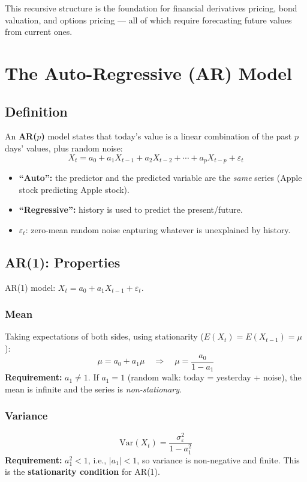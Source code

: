 \documentclass[11pt]{article}
\begin{document}
This recursive structure is the foundation for financial derivatives pricing,
bond valuation, and options pricing --- all of which require forecasting future
values from current ones.


\section{The Auto-Regressive (AR) Model}

\subsection{Definition}
An \textbf{AR($p$)} model states that today's value is a linear combination of
the past $p$ days' values, plus random noise:
\[
X_t = a_0 + a_1 X_{t-1} + a_2 X_{t-2} + \cdots + a_p X_{t-p} + \varepsilon_t
\]

\begin{itemize}
    \item \textbf{``Auto'':} the predictor and the predicted variable are the
      \emph{same} series (Apple stock predicting Apple stock).
    \item \textbf{``Regressive'':} history is used to predict the present/future.
    \item $\varepsilon_t$: zero-mean random noise capturing whatever is unexplained
      by history.
\end{itemize}

\subsection{AR(1): Properties}
AR(1) model: $X_t = a_0 + a_1 X_{t-1} + \varepsilon_t$.

\subsubsection{Mean}
Taking expectations of both sides, using stationarity ($E(X_t) = E(X_{t-1}) = \mu$):
\[
\mu = a_0 + a_1 \mu \quad\Rightarrow\quad \mu = \frac{a_0}{1 - a_1}
\]
\textbf{Requirement:} $a_1 \neq 1$. If $a_1 = 1$ (random walk: today = yesterday
+ noise), the mean is infinite and the series is \emph{non-stationary}.

\subsubsection{Variance}
\[
\text{Var}(X_t) = \frac{\sigma_\varepsilon^2}{1 - a_1^2}
\]
\textbf{Requirement:} $a_1^2 < 1$, i.e., $|a_1| < 1$, so variance is
non-negative and finite. This is the \textbf{stationarity condition} for AR(1).
\end{document}
